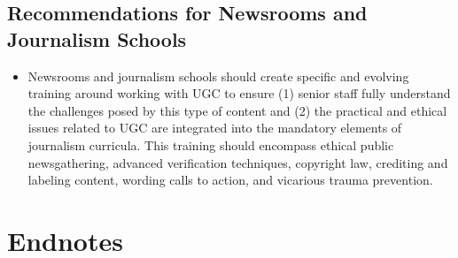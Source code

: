 \begin{enumerate}
\section{Recommendations for Newsrooms and Journalism Schools}
\begin{itemize}
\item Newsrooms and journalism schools should create specific and
evolving training around working with UGC to ensure (1) senior
staff fully understand the challenges posed by this type of content
and (2) the practical and ethical issues related to UGC are
integrated into the mandatory elements of journalism curricula.
This training should encompass ethical public newsgathering,
advanced verification techniques, copyright law, crediting
and labeling content, wording calls to action, and vicarious
trauma prevention.
\end{itemize}

\chapter{Endnotes}


\end{enumerate}
